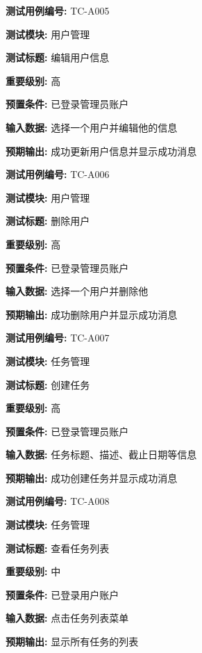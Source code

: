 \begin{framed} \textbf{测试用例编号:} TC-A005

\textbf{测试模块:} 用户管理

\textbf{测试标题:} 编辑用户信息

\textbf{重要级别:} 高

\textbf{预置条件:} 已登录管理员账户

\textbf{输入数据:} 选择一个用户并编辑他的信息

\textbf{预期输出:} 成功更新用户信息并显示成功消息

\begin{center}  \end{center} \end{framed}

\begin{framed} \textbf{测试用例编号:} TC-A006

\textbf{测试模块:} 用户管理

\textbf{测试标题:} 删除用户

\textbf{重要级别:} 高

\textbf{预置条件:} 已登录管理员账户

\textbf{输入数据:} 选择一个用户并删除他

\textbf{预期输出:} 成功删除用户并显示成功消息

\begin{center}  \end{center} \end{framed}

\begin{framed} \textbf{测试用例编号:} TC-A007

\textbf{测试模块:} 任务管理

\textbf{测试标题:} 创建任务

\textbf{重要级别:} 高

\textbf{预置条件:} 已登录管理员账户

\textbf{输入数据:} 任务标题、描述、截止日期等信息

\textbf{预期输出:} 成功创建任务并显示成功消息

\begin{center}  \end{center} \end{framed}

\begin{framed} \textbf{测试用例编号:} TC-A008

\textbf{测试模块:} 任务管理

\textbf{测试标题:} 查看任务列表

\textbf{重要级别:} 中

\textbf{预置条件:} 已登录用户账户

\textbf{输入数据:} 点击任务列表菜单

\textbf{预期输出:} 显示所有任务的列表

\begin{center}  \end{center} \end{framed}

